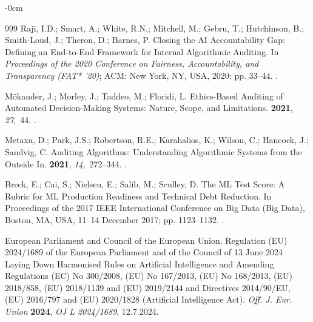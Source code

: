 \documentclass[systems,article,accept,moreauthors,pdftex]{Definitions/mdpi}
\begin{document}
\begin{adjustwidth}{-\extralength}{0cm}
\begin{thebibliography}{999}
Raji, I.D.; Smart, A.; White, R.N.; Mitchell, M.; Gebru, T.; Hutchinson, B.;
  Smith-Loud, J.; Theron, D.; Barnes, P.
\newblock Closing the {AI} Accountability Gap: Defining an End-to-End Framework
  for Internal Algorithmic Auditing.
\newblock In \emph{Proceedings of the  2020 Conference on Fairness,
  Accountability, and Transparency (FAT* '20)}; ACM: New York, NY, USA,  2020; pp.
  33--44.
.

M{\"o}kander, J.; Morley, J.; Taddeo, M.; Floridi, L.
\newblock Ethics-Based Auditing of Automated Decision-Making Systems: Nature,
  Scope, and Limitations.
 {\bf 2021}, {\em 27},~44.
.

Metaxa, D.; Park, J.S.; Robertson, R.E.; Karahalios, K.; Wilson, C.; Hancock,
  J.; Sandvig, C.
\newblock Auditing Algorithms: Understanding Algorithmic Systems from the
  Outside In.
 {\bf
  2021}, {\em 14},~272--344.
.

Breck, E.; Cai, S.; Nielsen, E.; Salib, M.; Sculley, D.
\newblock The {ML} Test Score: A Rubric for {ML} Production Readiness and
  Technical Debt Reduction.
\newblock In Proceedings of the  2017 IEEE International
  Conference on Big Data (Big Data), Boston, MA, USA, 11--14 December 2017; pp. 1123--1132.
.

{European Parliament and Council of the European Union}.
\newblock Regulation ({EU}) 2024/1689 of the {European} {Parliament} and of the
  {Council} of 13 {June} 2024 Laying Down Harmonised Rules on Artificial
  Intelligence and Amending Regulations ({EC}) No 300/2008, ({EU}) No 167/2013,
  ({EU}) No 168/2013, ({EU}) 2018/858, ({EU}) 2018/1139 and ({EU}) 2019/2144
  and Directives 2014/90/{EU}, ({EU}) 2016/797 and ({EU}) 2020/1828
  ({Artificial} {Intelligence} {Act}).
\newblock \emph{Off. J. Eur. Union} \textbf{2024}, \emph{OJ L 2024/1689}, 12.7.2024.


\end{thebibliography}
\end{adjustwidth}
\end{document}
